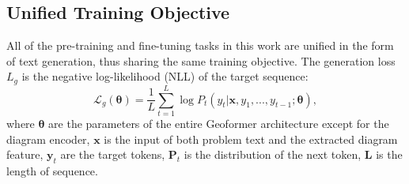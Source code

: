 \documentclass[11pt]{article}
\begin{document}
\subsection{Unified Training Objective}

All of the pre-training and fine-tuning tasks in this work are unified in the form of text generation, thus sharing the same training objective. The generation loss $L_g$ is the negative log-likelihood (NLL) of the target sequence:
{
\setlength\abovedisplayskip{0.45pt}
\setlength\belowdisplayskip{0.55pt}
\begin{equation*}
    \mathcal L_g(\bm \theta)=\frac{1}{L}\sum_{t=1}^L \log P_t(y_t|\bm x, y_1, ..., y_{t-1};\bm \theta),
\end{equation*}
}where $\bm \theta$ are the parameters of the entire Geoformer architecture except for the diagram encoder, $\bm x$ is the input of both problem text and the extracted diagram feature, $\bm y_t$ are the target tokens, $\bm P_t$ is the distribution of the next token, $\bm L$ is the length of sequence. 
\end{document}
